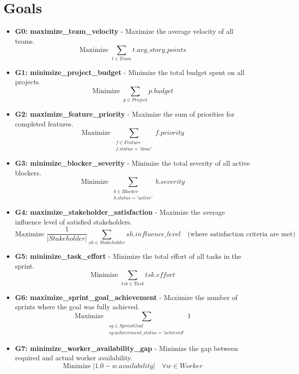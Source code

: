 \documentclass[11pt]{article}
\begin{document}
\section{Goals}
\begin{itemize}
    \item \textbf{G0: maximize\_team\_velocity} - Maximize the average velocity of all teams.
        \[ \text{Maximize } \sum_{t \in Team} t.avg\_story\_points \]
    \item \textbf{G1: minimize\_project\_budget} - Minimize the total budget spent on all projects.
        \[ \text{Minimize } \sum_{p \in Project} p.budget \]
    \item \textbf{G2: maximize\_feature\_priority} - Maximize the sum of priorities for completed features.
        \[ \text{Maximize } \sum_{\substack{f \in Feature \\ f.status = 'done'}} f.priority \]
    \item \textbf{G3: minimize\_blocker\_severity} - Minimize the total severity of all active blockers.
        \[ \text{Minimize } \sum_{\substack{b \in Blocker \\ b.status = 'active'}} b.severity \]
    \item \textbf{G4: maximize\_stakeholder\_satisfaction} - Maximize the average influence level of satisfied stakeholders.
        \[ \text{Maximize } \frac{1}{|Stakeholder|} \sum_{sh \in Stakeholder} sh.influence\_level \quad \text{(where satisfaction criteria are met)} \]
    \item \textbf{G5: minimize\_task\_effort} - Minimize the total effort of all tasks in the sprint.
        \[ \text{Minimize } \sum_{tsk \in Task} tsk.effort \]
    \item \textbf{G6: maximize\_sprint\_goal\_achievement} - Maximize the number of sprints where the goal was fully achieved.
        \[ \text{Maximize } \sum_{\substack{sg \in SprintGoal \\ sg.achievement\_status = 'achieved'}} 1 \]
    \item \textbf{G7: minimize\_worker\_availability\_gap} - Minimize the gap between required and actual worker availability.
        \[ \text{Minimize } |1.0 - w.availability| \quad \forall w \in Worker \]
\end{itemize}
\end{document}
